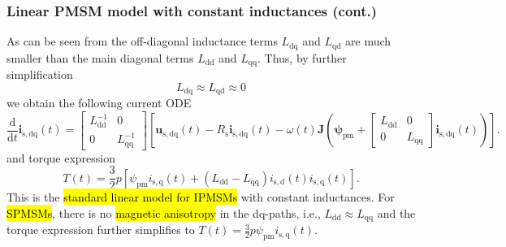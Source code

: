 \begin{frame}
    \frametitle{Linear PMSM model with constant inductances (cont.)}
    As can be seen from  the off-diagonal inductance terms $L_{\mathrm{dq}}$ and $L_{\mathrm{qd}}$ are much smaller than the main diagonal terms $L_{\mathrm{dd}}$ and $L_{\mathrm{qq}}$. \pause Thus, by further simplification
    $$
        L_{\mathrm{dq}} \approx L_{\mathrm{qd}} \approx 0
    $$\pause
    we obtain the following current ODE
    \begin{equation}
        \frac{\mathrm{d}}{\mathrm{d}t}\bm{i}_\mathrm{s,dq}(t) = \begin{bmatrix}
            L_{\mathrm{dd}}^{-1} & 0                    \\
            0                    & L_{\mathrm{qq}}^{-1}
        \end{bmatrix}\left[\bm{u}_\mathrm{s,dq}(t)- R_\mathrm{s} \bm{i}_\mathrm{s,dq}(t)- \omega(t)\bm{J}\left(\bm{\psi}_\mathrm{pm} + \begin{bmatrix}
                L_{\mathrm{dd}} & 0               \\
                0               & L_{\mathrm{qq}}
            \end{bmatrix} \bm{i}_\mathrm{s,dq}(t)\right)\right].
        \label{eq:PMSM_current_ODE_linear_mdl}
    \end{equation}\pause
    and torque expression
    \begin{equation}
        T(t) = \frac{3}{2}p\left[\psi_\mathrm{pm} i_\mathrm{s,q}(t) + (L_{\mathrm{dd}}-L_{\mathrm{qq}})i_\mathrm{s,d}(t)i_\mathrm{s,q}(t)\right].
    \end{equation}\pause
    This is the \hl{standard linear model for IPMSMs} with constant inductances. For \hl{SPMSMs}, there is no \hl{magnetic anisotropy} in the dq-paths, i.e., $L_{\mathrm{dd}} \approx L_{\mathrm{qq}}$ and the torque expression further simplifies to $T(t) = \frac{3}{2}p\psi_\mathrm{pm} i_\mathrm{s,q}(t)$.
\end{frame}

